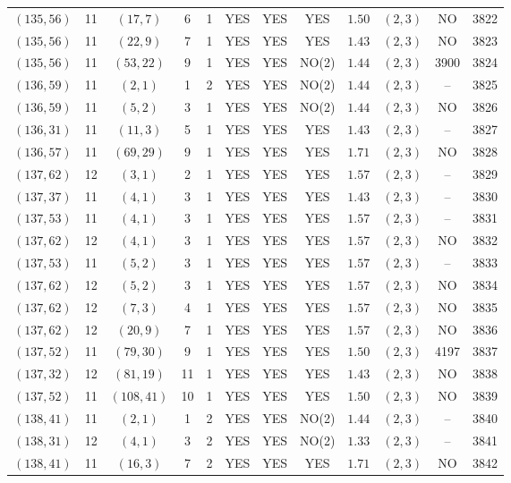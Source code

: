 \begin{longtable}{|c|c|c|c|c|c|c|c|c|c|c|c|}
$(135,56)$ & 11 & $(17,7)$ & 6 & 1 & YES & YES & YES & $1.50$ & $(2,3)$ & NO & 3822\\
$(135,56)$ & 11 & $(22,9)$ & 7 & 1 & YES & YES & YES & $1.43$ & $(2,3)$ & NO & 3823\\
$(135,56)$ & 11 & $(53,22)$ & 9 & 1 & YES & YES & NO(2) & $1.44$ & $(2,3)$ & 3900 & 3824\\
$(136,59)$ & 11 & $(2,1)$ & 1 & 2 & YES & YES & NO(2) & $1.44$ & $(2,3)$ & -- & 3825\\
$(136,59)$ & 11 & $(5,2)$ & 3 & 1 & YES & YES & NO(2) & $1.44$ & $(2,3)$ & NO & 3826\\
$(136,31)$ & 11 & $(11,3)$ & 5 & 1 & YES & YES & YES & $1.43$ & $(2,3)$ & -- & 3827\\
$(136,57)$ & 11 & $(69,29)$ & 9 & 1 & YES & YES & YES & $1.71$ & $(2,3)$ & NO & 3828\\
$(137,62)$ & 12 & $(3,1)$ & 2 & 1 & YES & YES & YES & $1.57$ & $(2,3)$ & -- & 3829\\
$(137,37)$ & 11 & $(4,1)$ & 3 & 1 & YES & YES & YES & $1.43$ & $(2,3)$ & -- & 3830\\
$(137,53)$ & 11 & $(4,1)$ & 3 & 1 & YES & YES & YES & $1.57$ & $(2,3)$ & -- & 3831\\
$(137,62)$ & 12 & $(4,1)$ & 3 & 1 & YES & YES & YES & $1.57$ & $(2,3)$ & NO & 3832\\
$(137,53)$ & 11 & $(5,2)$ & 3 & 1 & YES & YES & YES & $1.57$ & $(2,3)$ & -- & 3833\\
$(137,62)$ & 12 & $(5,2)$ & 3 & 1 & YES & YES & YES & $1.57$ & $(2,3)$ & NO & 3834\\
$(137,62)$ & 12 & $(7,3)$ & 4 & 1 & YES & YES & YES & $1.57$ & $(2,3)$ & NO & 3835\\
$(137,62)$ & 12 & $(20,9)$ & 7 & 1 & YES & YES & YES & $1.57$ & $(2,3)$ & NO & 3836\\
$(137,52)$ & 11 & $(79,30)$ & 9 & 1 & YES & YES & YES & $1.50$ & $(2,3)$ & 4197 & 3837\\
$(137,32)$ & 12 & $(81,19)$ & 11 & 1 & YES & YES & YES & $1.43$ & $(2,3)$ & NO & 3838\\
$(137,52)$ & 11 & $(108,41)$ & 10 & 1 & YES & YES & YES & $1.50$ & $(2,3)$ & NO & 3839\\
$(138,41)$ & 11 & $(2,1)$ & 1 & 2 & YES & YES & NO(2) & $1.44$ & $(2,3)$ & -- & 3840\\
$(138,31)$ & 12 & $(4,1)$ & 3 & 2 & YES & YES & NO(2) & $1.33$ & $(2,3)$ & -- & 3841\\
$(138,41)$ & 11 & $(16,3)$ & 7 & 2 & YES & YES & YES & $1.71$ & $(2,3)$ & NO & 3842\\

\end{longtable}
